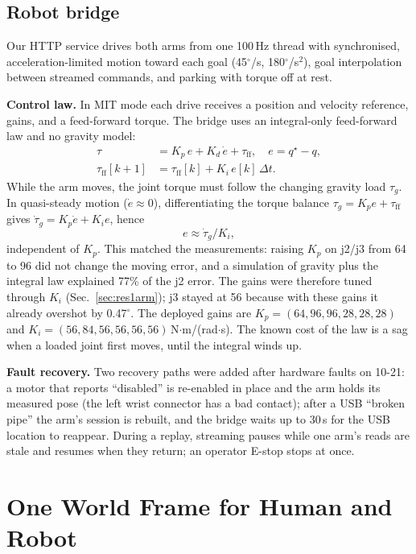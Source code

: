 \documentclass[conference,10pt]{IEEEtran}
\begin{document}
\subsection{Robot bridge}\label{sec:bridge}
Our HTTP service drives both arms from one 100\,Hz thread with synchronised, acceleration-limited motion toward each goal
(45$^\circ$/s, 180$^\circ$/s$^2$), goal interpolation between streamed commands, and parking with torque off at rest.

\textbf{Control law.} In MIT mode each drive receives a position and velocity reference, gains, and a feed-forward torque.
The bridge uses an integral-only feed-forward law and no gravity model:
\begin{align}
\tau&=K_p\,e+K_d\,\dot e+\tau_\mathrm{ff},\quad e=q^\star-q,\\
\tau_\mathrm{ff}[k+1]&=\tau_\mathrm{ff}[k]+K_i\,e[k]\,\Delta t .
\end{align}
While the arm moves, the joint torque must follow the changing gravity load $\tau_g$. In quasi-steady motion
($\dot e\approx0$), differentiating the torque balance $\tau_g=K_p e+\tau_\mathrm{ff}$ gives $\dot\tau_g=K_p\dot e+K_i e$,
hence
\begin{equation}
e\approx\dot\tau_g/K_i,
\end{equation}
independent of $K_p$. This matched the measurements: raising $K_p$ on j2/j3 from 64 to 96 did not change the moving error,
and a simulation of gravity plus the integral law explained 77\% of the j2 error. The gains were therefore tuned through
$K_i$ (Sec.~\ref{sec:res1arm}); j3 stayed at 56 because with these gains it already overshot by 0.47$^\circ$. The
deployed gains are $K_p=(64,96,96,28,28,28)$ and $K_i=(56,84,56,56,56,56)$\,N$\cdot$m/(rad$\cdot$s). The known cost of the
law is a sag when a loaded joint first moves, until the integral winds up.

\textbf{Fault recovery.} Two recovery paths were added after hardware faults on 10-21: a motor that reports ``disabled''
is re-enabled in place and the arm holds its measured pose (the left wrist connector has a bad contact); after a USB
``broken pipe'' the arm's session is rebuilt, and the bridge waits up to 30\,s for the USB location to reappear. During a
replay, streaming pauses while one arm's reads are stale and resumes when they return; an operator E-stop stops at once.

\section{One World Frame for Human and Robot}\label{sec:cal}
\end{document}
